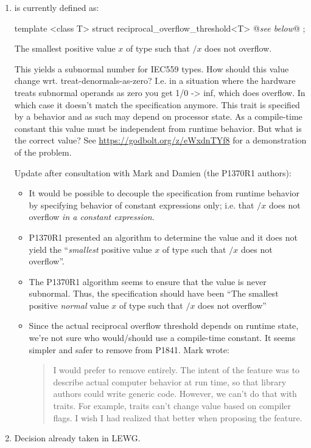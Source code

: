 \begin{enumerate}
  \item {} is currently defined as:
  \begin{wgText}
\begin{itemdecl}
  template <class T> struct reciprocal_overflow_threshold<T> { @\emph{see below}@ };
\end{itemdecl}
\begin{itemdescr}
\setcounter{Paras}{8}
  \pnum The smallest positive value $x$ of type  such that $/x$ does not overflow.
\end{itemdescr}
  \end{wgText}
  This yields a subnormal number for IEC559 types.
  How should this value change wrt. treat-denormals-as-zero?
  I.e. in a situation where the hardware treats subnormal operands as zero you get 1/0 -> inf, which does overflow.
  In which case it doesn't match the specification anymore.
  This trait is specified by a behavior and as such may depend on processor state.
  As a compile-time constant this value must be independent from runtime behavior.
  But what is the correct value?
  See \url{https://godbolt.org/z/eWxdnTYf8} for a demonstration of the problem.

  Update after consultation with Mark and Damien (the P1370R1 authors):
  \begin{itemize}
  \item It would be possible to decouple the specification from runtime behavior by specifying behavior of constant expressions only;
    i.e. that $/x$ does not overflow \emph{in a constant expression}.
  \item P1370R1 presented an algorithm to determine the value and it does not yield the “\emph{smallest} positive value $x$ of type  such that $/x$ does not overflow”.
  \item The P1370R1 algorithm seems to ensure that the value is never subnormal.
    Thus, the specification should have been “The smallest positive \emph{normal} value $x$ of type  such that $/x$ does not overflow”
  \item Since the actual reciprocal overflow threshold depends on runtime state, we're not sure who would/should use a compile-time constant.
    It seems simpler and safer to remove  from P1841.
    Mark wrote:
    \begin{quote}
    I would prefer to remove  entirely.  The
    intent of the feature was to describe actual computer behavior at run
    time, so that library authors could write generic code.  However, we
    can't do that with traits.  For example, traits can't change value based
    on compiler flags.  I wish I had realized that better when proposing
    the feature.
    \end{quote}
  \end{itemize}

  \item Decision already taken in LEWG.
\end{enumerate}

